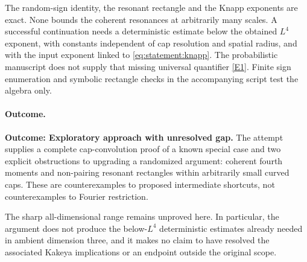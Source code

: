 \documentclass[11pt,a4paper]{article}
\newcommand{\eref}[2]{\hyperlink{extra:#1:#2}{[E#2]}}
\numberwithin{equation}{section}
\begin{document}
The random-sign identity, the resonant rectangle and the Knapp exponents
are exact. None bounds the coherent resonances at arbitrarily many scales.
A successful continuation needs a deterministic estimate below the obtained
$L^4$ exponent, with constants independent of cap resolution and spatial
radius, and with the input exponent linked to \eqref{eq:statement:knapp}. The
probabilistic manuscript does not supply that missing universal quantifier
\eref{statement}{1}. Finite sign enumeration and symbolic rectangle checks in the
accompanying script test the algebra only.

\paragraph{Outcome.}
\textbf{Outcome: Exploratory approach with unresolved gap.}
The attempt supplies a complete cap-convolution proof of a known special
case and two explicit obstructions to upgrading a randomized argument:
coherent fourth moments and non-pairing resonant rectangles within arbitrarily
small curved caps. These are counterexamples to proposed intermediate
shortcuts, not counterexamples to Fourier restriction.

The sharp all-dimensional range remains unproved here. In particular,
the argument does not produce the below-$L^4$ deterministic estimates already
needed in ambient dimension three, and it makes no claim to have resolved
the associated Kakeya implications or an endpoint outside the original scope.
\end{document}
